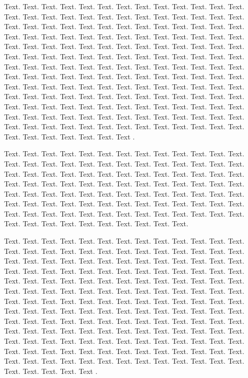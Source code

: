 \documentclass[a4,center,fleqn]{NAR}
\begin{document}
Text. Text. Text. Text. Text. Text.
Text. Text. Text. Text. Text. Text. Text. Text. Text. Text. Text.
Text. Text. Text. Text. Text. Text. Text. Text. Text. Text. Text.
Text. Text. Text. Text. Text. Text. Text. Text. Text. Text. Text.
Text. Text. Text. Text. Text. Text. Text. Text. Text. Text. Text.
Text. Text. Text. Text. Text. Text. Text. Text. Text. Text. Text.
Text. Text. Text. Text. Text. Text. Text. Text. Text. Text. Text.
Text. Text. Text. Text. Text. Text. Text. Text. Text. Text. Text.
Text. Text. Text. Text. Text. Text. Text. Text. Text. Text. Text.
Text. Text. Text. Text. Text. Text. Text. Text. Text. Text. Text.
Text. Text. Text. Text. Text. Text. Text. Text. Text. Text. Text.
Text. Text. Text. Text. Text. Text. Text. Text. Text. Text. Text.
Text. Text. Text. Text. Text. Text. Text. Text. Text. Text. Text.
Text. Text. Text. Text. Text. Text. Text. Text. Text. Text. Text.
Text. Text. Text. Text. Text. Text. Text. Text. Text. Text. Text.
Text. Text. Text. Text. Text. Text. Text. Text. Text. Text. Text.
Text. Text. Text. Text.
Text \cite{2,3}.

Text. Text. Text. Text. Text. Text. Text. Text. Text. Text. Text.
Text. Text. Text. Text. Text. Text. Text. Text. Text. Text. Text.
Text. Text. Text. Text. Text. Text. Text. Text. Text. Text. Text.
Text. Text. Text. Text. Text. Text. Text. Text. Text. Text. Text.
Text. Text. Text. Text. Text. Text. Text. Text. Text. Text. Text.
Text. Text. Text. Text. Text. Text. Text. Text. Text. Text. Text.
Text. Text. Text. Text. Text. Text. Text. Text. Text. Text. Text.
Text. Text. Text. Text. Text. Text. Text. Text. Text. Text. Text.
Text. Text. Text. Text. Text. Text. Text. Text. Text. Text. Text.
Text. Text.

Text. Text. Text. Text. Text. Text. Text. Text. Text. Text. Text.
Text. Text. Text. Text. Text. Text. Text. Text. Text. Text. Text.
Text. Text. Text. Text. Text. Text. Text. Text. Text. Text. Text.
Text. Text. Text. Text. Text. Text. Text. Text. Text. Text. Text.
Text. Text. Text. Text. Text. Text. Text. Text. Text. Text. Text.
Text. Text. Text. Text. Text. Text. Text. Text. Text. Text. Text.
Text. Text. Text. Text. Text. Text. Text. Text. Text. Text. Text.
Text. Text. Text. Text. Text. Text. Text. Text. Text. Text. Text.
Text. Text. Text. Text. Text. Text. Text. Text. Text. Text. Text.
Text. Text. Text. Text. Text. Text. Text. Text. Text. Text. Text.
Text. Text. Text. Text. Text. Text. Text. Text. Text. Text. Text.
Text. Text. Text. Text. Text. Text. Text. Text. Text. Text. Text.
Text. Text. Text. Text. Text. Text. Text. Text. Text. Text. Text.
Text. Text. Text. Text. Text. Text. Text. Text. Text. Text. Text.
Text. Text. Text. Text. Text. Text. Text. Text. Text. Text. Text.
Text. Text. Text. Text. Text. Text. Text. Text.
Text \cite{4}.
\end{document}
